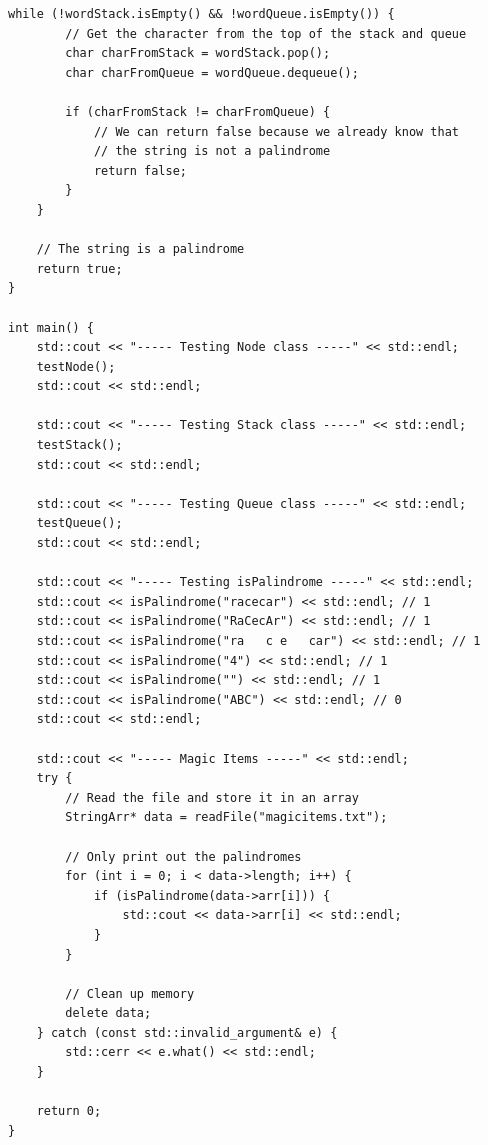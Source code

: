 \documentclass[letterpaper, 10pt,DIV=13]{scrartcl}
\numberwithin{equation}{section} %
\numberwithin{figure}{section} %
\numberwithin{table}{section} %
\begin{document}
\begin{lstlisting}[frame=single, ]
    while (!wordStack.isEmpty() && !wordQueue.isEmpty()) {
        // Get the character from the top of the stack and queue
        char charFromStack = wordStack.pop();
        char charFromQueue = wordQueue.dequeue();

        if (charFromStack != charFromQueue) {
            // We can return false because we already know that
            // the string is not a palindrome
            return false;
        }
    }

    // The string is a palindrome
    return true;
}

int main() {
    std::cout << "----- Testing Node class -----" << std::endl;
    testNode();
    std::cout << std::endl;

    std::cout << "----- Testing Stack class -----" << std::endl;
    testStack();
    std::cout << std::endl;

    std::cout << "----- Testing Queue class -----" << std::endl;
    testQueue();
    std::cout << std::endl;

    std::cout << "----- Testing isPalindrome -----" << std::endl;
    std::cout << isPalindrome("racecar") << std::endl; // 1
    std::cout << isPalindrome("RaCecAr") << std::endl; // 1
    std::cout << isPalindrome("ra   c e   car") << std::endl; // 1
    std::cout << isPalindrome("4") << std::endl; // 1
    std::cout << isPalindrome("") << std::endl; // 1
    std::cout << isPalindrome("ABC") << std::endl; // 0
    std::cout << std::endl;

    std::cout << "----- Magic Items -----" << std::endl;
    try {
        // Read the file and store it in an array
        StringArr* data = readFile("magicitems.txt");

        // Only print out the palindromes
        for (int i = 0; i < data->length; i++) {
            if (isPalindrome(data->arr[i])) {
                std::cout << data->arr[i] << std::endl;
            }
        }

        // Clean up memory
        delete data;
    } catch (const std::invalid_argument& e) {
        std::cerr << e.what() << std::endl;
    }

    return 0;
}
\end{lstlisting}
\end{document}
